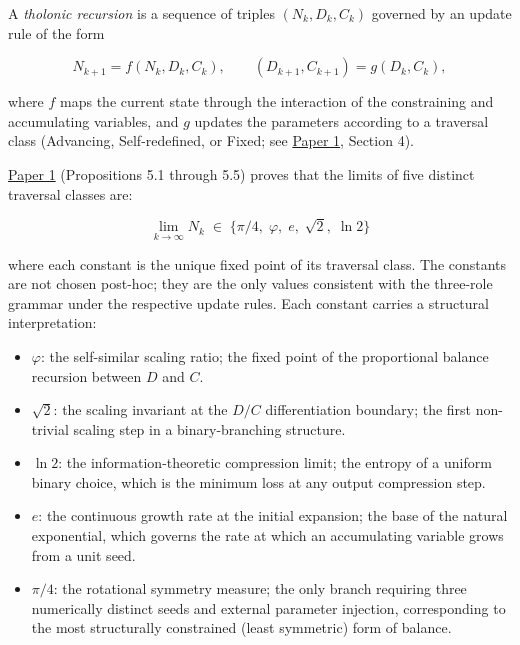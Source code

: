 \documentclass[12pt]{article}
\providecommand{\tightlist}{%
  \setlength{\itemsep}{0pt}\setlength{\parskip}{0pt}}
\begin{document}
A \emph{tholonic recursion} is a sequence of triples \((N_k, D_k, C_k)\)
governed by an update rule of the form

\[N_{k+1} = f(N_k, D_k, C_k), \qquad (D_{k+1}, C_{k+1}) = g(D_k, C_k),\]

where \(f\) maps the current state through the interaction of the
constraining and accumulating variables, and \(g\) updates the
parameters according to a traversal class (Advancing, Self-redefined, or
Fixed; see
\href{https://github.com/baardev/truevalue/blob/main/docnav/Research/papers/1_recursive-tholonic-five-constants/1_recursive-tholonic-five-constants.pdf}{Paper
1}, Section 4).

\href{https://github.com/baardev/truevalue/blob/main/docnav/Research/papers/1_recursive-tholonic-five-constants/1_recursive-tholonic-five-constants.pdf}{Paper
1} (Propositions 5.1 through 5.5) proves that the limits of five
distinct traversal classes are:

\[\lim_{k\to\infty} N_k \;\in\; \{\pi/4,\; \varphi,\; e,\; \sqrt{2},\; \ln 2\}\]

where each constant is the unique fixed point of its traversal class.
The constants are not chosen post-hoc; they are the only values
consistent with the three-role grammar under the respective update
rules. Each constant carries a structural interpretation:

\begin{itemize}
\tightlist
\item
  \(\varphi\): the self-similar scaling ratio; the fixed point of the
  proportional balance recursion between \(D\) and \(C\).
\item
  \(\sqrt{2}\): the scaling invariant at the \(D/C\) differentiation
  boundary; the first non-trivial scaling step in a binary-branching
  structure.
\item
  \(\ln 2\): the information-theoretic compression limit; the entropy of
  a uniform binary choice, which is the minimum loss at any output
  compression step.
\item
  \(e\): the continuous growth rate at the initial expansion; the base
  of the natural exponential, which governs the rate at which an
  accumulating variable grows from a unit seed.
\item
  \(\pi/4\): the rotational symmetry measure; the only branch requiring
  three numerically distinct seeds and external parameter injection,
  corresponding to the most structurally constrained (least symmetric)
  form of balance.
\end{itemize}
\end{document}
